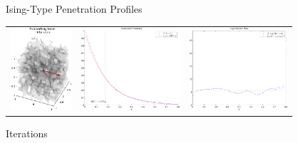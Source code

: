 \addtocounter{framenumber}{-1}
\begin{tframe}{Ising-Type Penetration Profiles}

\bigskip
\begin{center}
\begin{tabular}{ccc}
\includegraphics[height=1.2in]{media_exploration/ising_cell_016}&
\includegraphics[height=1.2in]{media_exploration/ising_penetration_016}&
\includegraphics[height=1.2in]{media_exploration/ising_extinction_016}
\end{tabular}
 \end{center}

 Iterations
\end{tframe}

